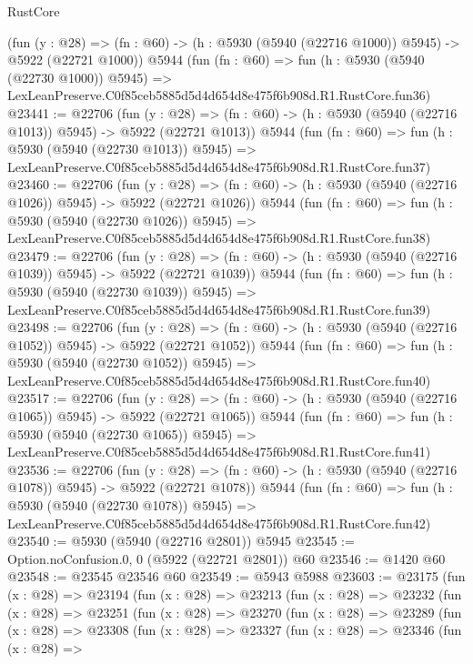 \begin{lexlean}{RustCore}
\begin{coremodule}
    (fun (y : @28) =>
    (fn : @60) -> (h : @5930 (@5940 (@22716 @1000)) @5945) -> @5922 (@22721 @1000))
    @5944
    (fun (fn : @60) =>
    fun (h : @5930 (@5940 (@22730 @1000)) @5945) =>
    LexLeanPreserve.C0f85ceb5885d5d4d654d8e475f6b908d.R1.RustCore.fun36)
@23441 := @22706
    (fun (y : @28) =>
    (fn : @60) -> (h : @5930 (@5940 (@22716 @1013)) @5945) -> @5922 (@22721 @1013))
    @5944
    (fun (fn : @60) =>
    fun (h : @5930 (@5940 (@22730 @1013)) @5945) =>
    LexLeanPreserve.C0f85ceb5885d5d4d654d8e475f6b908d.R1.RustCore.fun37)
@23460 := @22706
    (fun (y : @28) =>
    (fn : @60) -> (h : @5930 (@5940 (@22716 @1026)) @5945) -> @5922 (@22721 @1026))
    @5944
    (fun (fn : @60) =>
    fun (h : @5930 (@5940 (@22730 @1026)) @5945) =>
    LexLeanPreserve.C0f85ceb5885d5d4d654d8e475f6b908d.R1.RustCore.fun38)
@23479 := @22706
    (fun (y : @28) =>
    (fn : @60) -> (h : @5930 (@5940 (@22716 @1039)) @5945) -> @5922 (@22721 @1039))
    @5944
    (fun (fn : @60) =>
    fun (h : @5930 (@5940 (@22730 @1039)) @5945) =>
    LexLeanPreserve.C0f85ceb5885d5d4d654d8e475f6b908d.R1.RustCore.fun39)
@23498 := @22706
    (fun (y : @28) =>
    (fn : @60) -> (h : @5930 (@5940 (@22716 @1052)) @5945) -> @5922 (@22721 @1052))
    @5944
    (fun (fn : @60) =>
    fun (h : @5930 (@5940 (@22730 @1052)) @5945) =>
    LexLeanPreserve.C0f85ceb5885d5d4d654d8e475f6b908d.R1.RustCore.fun40)
@23517 := @22706
    (fun (y : @28) =>
    (fn : @60) -> (h : @5930 (@5940 (@22716 @1065)) @5945) -> @5922 (@22721 @1065))
    @5944
    (fun (fn : @60) =>
    fun (h : @5930 (@5940 (@22730 @1065)) @5945) =>
    LexLeanPreserve.C0f85ceb5885d5d4d654d8e475f6b908d.R1.RustCore.fun41)
@23536 := @22706
    (fun (y : @28) =>
    (fn : @60) -> (h : @5930 (@5940 (@22716 @1078)) @5945) -> @5922 (@22721 @1078))
    @5944
    (fun (fn : @60) =>
    fun (h : @5930 (@5940 (@22730 @1078)) @5945) =>
    LexLeanPreserve.C0f85ceb5885d5d4d654d8e475f6b908d.R1.RustCore.fun42)
@23540 := @5930 (@5940 (@22716 @2801)) @5945
@23545 := Option.noConfusion.{0, 0} (@5922 (@22721 @2801)) @60
@23546 := @1420 @60
@23548 := @23545 @23546 @60
@23549 := @5943 @5988
@23603 := @23175
    (fun (x : @28) =>
    @23194
      (fun (x : @28) =>
      @23213
        (fun (x : @28) =>
        @23232
          (fun (x : @28) =>
          @23251
            (fun (x : @28) =>
            @23270
              (fun (x : @28) =>
              @23289
                (fun (x : @28) =>
                @23308
                  (fun (x : @28) =>
                  @23327
                    (fun (x : @28) =>
                    @23346
                      (fun (x : @28) =>

\end{coremodule}
\end{lexlean}

